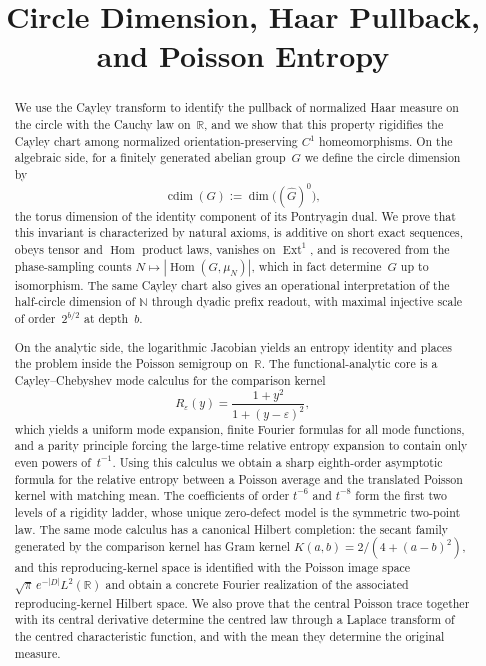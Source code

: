 \documentclass[12pt,a4paper]{article}
\title{Circle Dimension, Haar Pullback, and Poisson Entropy}
\author{}
\date{}
\theoremstyle{plain}
\theoremstyle{definition}
\numberwithin{equation}{section}
\DeclareMathOperator{\cdim}{cdim}
\newcommand{\RR}{\mathbb{R}}
\newcommand{\NN}{\mathbb{N}}
\begin{document}
\maketitle

\begin{abstract}
We use the Cayley transform to identify the pullback of normalized Haar
measure on the circle with the Cauchy law on~$\RR$, and we show that
this property rigidifies the Cayley chart among normalized
orientation-preserving $C^{1}$ homeomorphisms.  On the algebraic side,
for a finitely generated abelian group~$G$ we define the circle
dimension by
\[
\cdim(G):=\dim\bigl((\widehat G)^0\bigr),
\]
the torus dimension of the identity component of its Pontryagin dual.
We prove that this invariant is characterized by natural axioms, is
additive on short exact sequences, obeys tensor and $\operatorname{Hom}$
product laws, vanishes on $\operatorname{Ext}^{1}$, and is recovered
from the phase-sampling counts $N\mapsto |\operatorname{Hom}(G,\mu_N)|$,
which in fact determine~$G$ up to isomorphism.  The same Cayley chart
also gives an operational interpretation of the half-circle dimension of
$\NN$ through dyadic prefix readout, with maximal injective scale of
order~$2^{b/2}$ at depth~$b$.

On the analytic side, the logarithmic Jacobian yields an entropy
identity and places the problem inside the Poisson semigroup on~$\RR$.
The functional-analytic core is a Cayley--Chebyshev mode calculus for
the comparison kernel
\[
R_\varepsilon(y)=\frac{1+y^{2}}{1+(y-\varepsilon)^{2}},
\]
which yields a uniform mode expansion, finite Fourier formulas for all
mode functions, and a parity principle forcing the large-time relative
entropy expansion to contain only even powers of~$t^{-1}$.  Using this
calculus we obtain a sharp eighth-order asymptotic formula for the
relative entropy between a Poisson average and the translated Poisson
kernel with matching mean.  The coefficients of order $t^{-6}$ and
$t^{-8}$ form the first two levels of a rigidity ladder, whose unique
zero-defect model is the symmetric two-point law.  The same mode
calculus has a canonical Hilbert completion: the secant family generated
by the comparison kernel has Gram kernel
$K(a,b)=2/(4+(a-b)^{2})$, and this reproducing-kernel space is
identified with the Poisson image space
$\sqrt{\pi}\,e^{-|D|}L^{2}(\RR)$ and obtain a concrete Fourier
realization of the associated reproducing-kernel Hilbert space.  We also
prove that the central Poisson trace together with its central
derivative determine the centred law through a Laplace transform of the
centred characteristic function, and with the mean they determine the
original measure.
\end{abstract}
\end{document}
